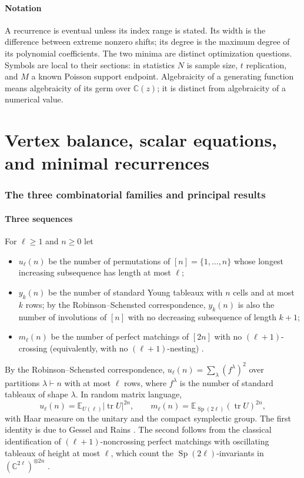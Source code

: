 \documentclass[11pt,a4paper]{article}
\theoremstyle{definition}
\theoremstyle{remark}
\newcommand{\C}{\mathbb C}
\newcommand{\E}{\mathbb E}
\DeclareMathOperator{\tr}{tr}
\DeclareMathOperator{\Sp}{Sp}
\numberwithin{equation}{section}
\begin{document}
\subsection*{Notation}
A recurrence is eventual unless its index range is stated. Its width
is the difference between extreme nonzero shifts; its degree is the
maximum degree of its polynomial coefficients. The two minima are
distinct optimization questions. Symbols are local to their sections:
in statistics $N$ is sample size, $t$ replication, and $M$ a known
Poisson support endpoint. Algebraicity of a generating function means
algebraicity of its germ over $\mathbb C(z)$; it is distinct from
algebraicity of a numerical value.


\clearpage\part{Vertex balance, scalar equations, and minimal recurrences}

\section{The three combinatorial families and principal results}\label{B:families:main}


\subsection{Three sequences}
For $\ell\ge1$ and $n\ge0$ let
\begin{itemize}
\item $u_\ell(n)$ be the number of permutations of $[n]=\{1,\dots,n\}$ whose longest increasing subsequence has length at most $\ell$;
\item $y_k(n)$ be the number of standard Young tableaux with $n$ cells and at most $k$ rows; by the Robinson--Schensted correspondence, $y_k(n)$ is also the number of involutions of $[n]$ with no decreasing subsequence of length $k+1$;
\item $m_\ell(n)$ be the number of perfect matchings of $[2n]$ with no $(\ell+1)$-crossing (equivalently, with no $(\ell+1)$-nesting) \cite{CDDSY07}.
\end{itemize}
By the Robinson--Schensted correspondence, $u_\ell(n)=\sum_{\lambda}(f^\lambda)^2$ over partitions $\lambda\vdash n$ with at most $\ell$ rows, where $f^\lambda$ is the number of standard tableaux of shape $\lambda$. In random matrix language,
\begin{equation}\label{B:eq:moments}
u_\ell(n)=\E_{U(\ell)}|\tr U|^{2n},\qquad m_\ell(n)=\E_{\Sp(2\ell)}(\tr U)^{2n},
\end{equation}
with Haar measure on the unitary and the compact symplectic group. The first identity is due to Gessel and Rains \cite{Ges90,Rai98}. The second follows from the classical identification of $(\ell+1)$-noncrossing perfect matchings with oscillating tableaux of height at most $\ell$, which count the $\Sp(2\ell)$-invariants in $(\C^{2\ell})^{\otimes 2n}$ \cite{Ber86,Sun90,CDDSY07}.
\end{document}
